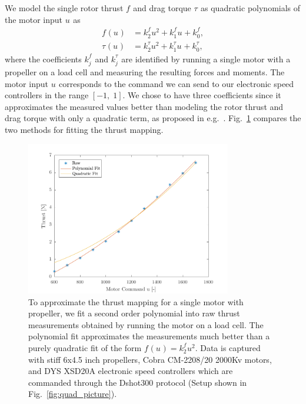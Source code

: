 \documentclass[10pt,a4paper,fleqn]{article}
\newcommand{\rotthrust}[1]{f_{#1}}
\newcommand{\rottorque}[1]{\tau_{#1}}
\newcommand{\motinput}[1]{u_{#1}}
\newcommand{\mapcoeff}[2]{k_{#2}^{#1}}
\begin{document}
We model the single rotor thrust $\rotthrust{}$ and drag torque $\rottorque{}$ as quadratic polynomials of the motor input $\motinput{}$ as
%
\begin{align}
	\rotthrust{}(\motinput{}) &= \mapcoeff{\rotthrust{}}{2} \motinput{}^2 + \mapcoeff{\rotthrust{}}{1} \motinput{} + \mapcoeff{\rotthrust{}}{0}, \label{eq:thrust_mapping}\\
	\rottorque{}(\motinput{}) &= \mapcoeff{\rottorque{}}{2} \motinput{}^2 + \mapcoeff{\rottorque{}}{1} \motinput{} + \mapcoeff{\rottorque{}}{0}, \label{eq:torque_mapping}
\end{align}
%
where the coefficients $\mapcoeff{\rotthrust{}}{j}$ and $\mapcoeff{\rottorque{}}{j}$ are identified by running a single motor with a propeller on a load cell and measuring the resulting forces and moments.
The motor input $\motinput{}$ corresponds to the command we can send to our electronic speed controllers in the range $[-1, \; 1]$.
We chose to have three coefficients since it approximates the measured values better than modeling the rotor thrust and drag torque with only a quadratic term, as proposed in e.g.~\cite{Michael10ram}. 
Fig.~\ref{fig:thrust_mapping_fit} compares the two methods for fitting the thrust mapping.
%
\begin{figure}[t]
   \centering
   \includegraphics[width=0.8\textwidth]{img/thrust_mapping_fit_fpv.pdf}
   \caption{To approximate the thrust mapping for a single motor with propeller, we fit a second order polynomial into raw thrust measurements obtained by running the motor on a load cell. The polynomial fit approximates the measurements much better than a purely quadratic fit of the form $\rotthrust{}(\motinput{}) = \mapcoeff{\rotthrust{}}{2} \motinput{}^2$. Data is captured with stiff 6x4.5 inch propellers, Cobra CM-2208/20 2000Kv motors, and DYS XSD20A electronic speed controllers which are commanded through the Dshot300 protocol (Setup shown in Fig.~\ref{fig:quad_picture}).}
   \label{fig:thrust_mapping_fit}
\end{figure}
\end{document}

